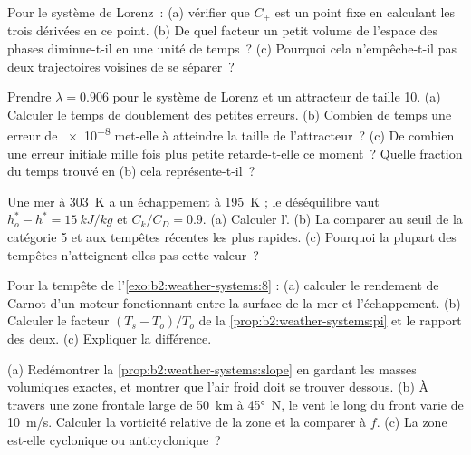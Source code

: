\begin{exercise}[$\star\star$]\label{exo:b2:weather-systems:6}
Pour le système de Lorenz~: (a) vérifier que $C_+$ est un point fixe en calculant les trois dérivées
en ce point. (b) De quel facteur un petit volume de l'espace des phases diminue-t-il en une unité de temps~? (c) Pourquoi
cela n'empêche-t-il pas deux trajectoires voisines de se séparer~?
\end{exercise}

\begin{exercise}[$\star\star$]\label{exo:b2:weather-systems:7}
Prendre $\lambda = 0.906$ pour le système de Lorenz et un attracteur de taille 10. (a) Calculer le
temps de doublement des petites erreurs. (b) Combien de temps une erreur de \num{e-8} met-elle à atteindre la taille de
l'attracteur~? (c) De combien une erreur initiale mille fois plus petite retarde-t-elle ce moment~? Quelle fraction du temps trouvé en
(b) cela représente-t-il~?
\end{exercise}

\begin{exercise}[$\star\star$]\label{exo:b2:weather-systems:8}
Une mer à \qty{303}{K} a un échappement à \qty{195}{K} ; le déséquilibre vaut $h_o^* - h^* =
\qty{15}{kJ/kg}$ et $C_k/C_D = 0.9$. (a) Calculer l'. (b) La comparer au seuil
de la catégorie 5 et aux tempêtes récentes les plus rapides. (c) Pourquoi la plupart des tempêtes
n'atteignent-elles pas cette valeur~?
\end{exercise}

\begin{exercise}[$\star\star$]\label{exo:b2:weather-systems:9}
Pour la tempête de l'\cref{exo:b2:weather-systems:8} : (a) calculer le rendement de Carnot d'un moteur
fonctionnant entre la surface de la mer et l'échappement. (b) Calculer le facteur $(T_s - T_o)/T_o$ de
la \cref{prop:b2:weather-systems:pi} et le rapport des deux. (c) Expliquer la différence.
\end{exercise}

\begin{exercise}[$\star\star\star$]\label{exo:b2:weather-systems:10}
(a) Redémontrer la \cref{prop:b2:weather-systems:slope} en gardant les masses volumiques exactes, et montrer que
l'air froid doit se trouver dessous. (b) À travers une zone frontale large de \qty{50}{km} à \ang{45}~N, le vent
le long du front varie de \qty{10}{m/s}. Calculer la vorticité relative de la zone et la comparer à
$f$. (c) La zone est-elle cyclonique ou anticyclonique~?
\end{exercise}

